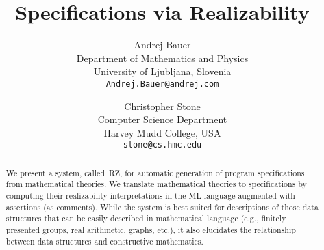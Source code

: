 \documentclass{article}
\newcommand{\RZ}{RZ\xspace}
\begin{document}
\twocolumn

\title{Specifications via Realizability}

\author{
  Andrej Bauer\\
  {\small Department of Mathematics and Physics}\\
  {\small University of Ljubljana, Slovenia}\\
  {\small \texttt{Andrej.Bauer@andrej.com}}
  \and
  Christopher Stone\\
  {\small Computer Science Department}\\
  {\small Harvey Mudd College, USA}\\
  {\small \texttt{stone@cs.hmc.edu}}
}

\maketitle

\begin{abstract}
  We present a system, called~\RZ, for automatic generation of program
  specifications from mathematical theories. We translate mathematical
  theories to specifications by computing their realizability
  interpretations in the ML language augmented with assertions (as
  comments). While the system is best suited for descriptions of those
  data structures that can be easily described in mathematical
  language (e.g., finitely presented groups, real arithmetic, graphs,
  etc.), it also elucidates the relationship between data structures
  and constructive mathematics.
\end{abstract}

















\end{document}
